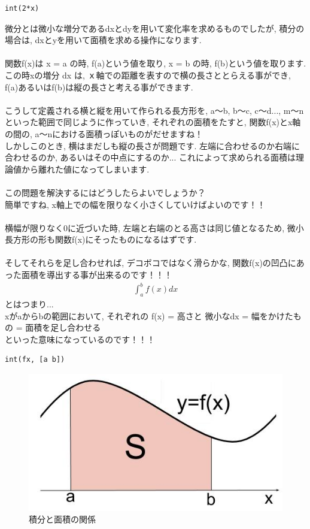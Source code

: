 \documentclass[11pt,a4paper,uplatex]{ujreport}
\begin{document}
\begin{lstlisting}[caption=\ref{eq:int}のコード,label=sc:int]
int(2*x)
\end{lstlisting}


微分とは微小な増分であるdxとdyを用いて変化率を求めるものでしたが, 積分の場合は, dxとyを用いて面積を求める操作になります.\\
\\
関数f(x)は x = a の時, f(a)という値を取り, x = b の時, f(b)という値を取ります. この時xの増分 dx は, ｘ軸での距離を表すので横の長さととらえる事ができ, f(a)あるいはf(b)は縦の長さと考える事ができます.\\
\\
こうして定義される横と縦を用いて作られる長方形を, a～b, b～c, c～d..., m～nといった範囲で同じように作っていき, それぞれの面積をたすと, 関数f(x)とx軸の間の, a～nにおける面積っぽいものがだせますね！\\
しかしこのとき, 横はまだしも縦の長さが問題です. 左端に合わせるのか右端に合わせるのか, あるいはその中点にするのか... これによって求められる面積は理論値から離れた値になってしまいます.\\
\\
この問題を解決するにはどうしたらよいでしょうか？\\
簡単ですね, x軸上での幅を限りなく小さくしていけばよいのです！！\\
\\
横幅が限りなく0に近づいた時, 左端と右端のとる高さは同じ値となるため, 微小長方形の形も関数f(x)にそったものになるはずです.\\
\\
そしてそれらを足し合わせれば, デコボコではなく滑らかな, 関数f(x)の凹凸にあった面積を導出する事が出来るのです！！！
\begin{eqnarray}
\label{eq:int2}
\int_a^b f(x) dx
\end{eqnarray}
とはつまり...\\
xがaからbの範囲において, それぞれの f(x) = 高さと 微小なdx = 幅をかけたもの = 面積を足し合わせる\\
といった意味になっているのです！！！



\begin{lstlisting}[caption=\ref{eq:int2}のコード,label=sc:int2]
int(fx, [a b])
\end{lstlisting}


\begin{figure}[H]
\label{im:integral}
  \centering
  \includegraphics[width=120mm,bb=0 0 480 259]{../figures/int.jpg}
  \caption{積分と面積の関係}
\end{figure}
\end{document}
